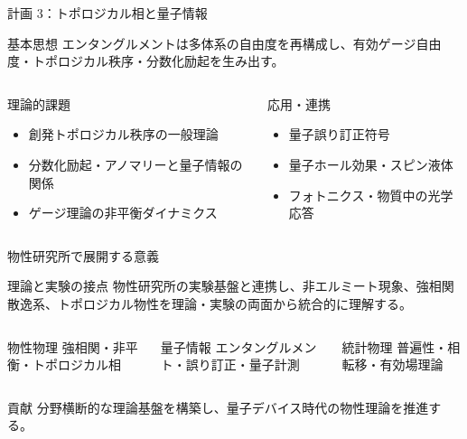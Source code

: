 \documentclass[aspectratio=169,11pt]{beamer}
\begin{document}
\begin{frame}{計画 3：トポロジカル相と量子情報}
\begin{block}{基本思想}
エンタングルメントは多体系の自由度を再構成し、有効ゲージ自由度・トポロジカル秩序・分数化励起を生み出す。
\end{block}
\begin{columns}[T]
\begin{block}{理論的課題}
\begin{itemize}
  \item 創発トポロジカル秩序の一般理論
  \item 分数化励起・アノマリーと量子情報の関係
  \item ゲージ理論の非平衡ダイナミクス
\end{itemize}
\end{block}
\begin{block}{応用・連携}
\begin{itemize}
  \item 量子誤り訂正符号
  \item 量子ホール効果・スピン液体
  \item フォトニクス・物質中の光学応答
\end{itemize}
\end{block}
\end{columns}
\end{frame}

\begin{frame}{物性研究所で展開する意義}
\begin{block}{理論と実験の接点}
物性研究所の実験基盤と連携し、非エルミート現象、強相関散逸系、トポロジカル物性を理論・実験の両面から統合的に理解する。
\end{block}
\begin{columns}[T]
\begin{block}{物性物理}
強相関・非平衡・トポロジカル相
\end{block}
\begin{block}{量子情報}
エンタングルメント・誤り訂正・量子計測
\end{block}
\begin{block}{統計物理}
普遍性・相転移・有効場理論
\end{block}
\end{columns}
\vspace{0.6em}
\begin{alertblock}{貢献}
分野横断的な理論基盤を構築し、量子デバイス時代の物性理論を推進する。
\end{alertblock}
\end{frame}
\end{document}
